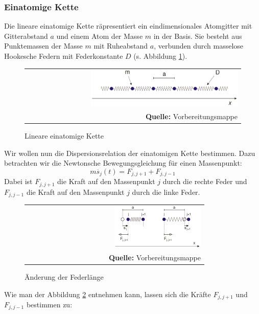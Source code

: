 \documentclass[a4paper,titlepage]{scrartcl}
\numberwithin{equation}{section}
\begin{document}
\subsubsection{Einatomige Kette}
Die lineare einatomige Kette räpresentiert ein eindimensionales Atomgitter mit Gitterabstand $a$ und einem Atom der Masse $m$ in der Basis. Sie besteht aus Punktemassen der Masse $m$ mit Ruheabstand $a$, verbunden durch masselose Hookesche Federn mit Federkonstante $D$ (s. Abbildung \ref{fig:einatomkette}).
\begin{figure}[H]
	\centering
	\begin{tabular}{@{}r@{}}
		\includegraphics[width=0.7\textwidth]{images/einatomkette.png}\\
		\footnotesize\sffamily\textbf{Quelle:} Vorbereitungsmappe \cite{vorbereitungsmappe}
	\end{tabular}
	\caption{Lineare einatomige Kette}
    \label{fig:einatomkette}
\end{figure}
Wir wollen nun die Dispersionsrelation der einatomigen Kette bestimmen. Dazu betrachten wir die Newtonsche Bewegungsgleichung für einen Massenpunkt:
\begin{equation*}
m\ddot{s_j}(t)=F_{j,j+1}+F_{j,j-1}
\end{equation*}
Dabei ist $F_{j,j+1}$ die Kraft auf den Massenpunkt $j$ durch die rechte Feder und $F_{j,j-1}$ die Kraft auf den Massenpunkt $j$ durch die linke Feder.
\begin{figure}[H]
	\centering
	\begin{tabular}{@{}r@{}}
		\includegraphics[width=0.5\textwidth]{images/einatomkettekraft.png}\\
		\footnotesize\sffamily\textbf{Quelle:} Vorbereitungsmappe \cite{vorbereitungsmappe}
	\end{tabular}
	\caption{Änderung der Federlänge}
    \label{fig:einatomkettekraft}
\end{figure}
Wie man der Abbildung \ref{fig:einatomkettekraft} entnehmen kann, lassen sich die Kräfte $F_{j,j+1}$ und $F_{j,j-1}$ bestimmen zu:
\end{document}
